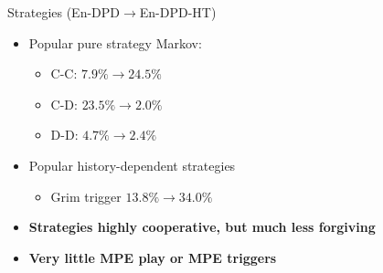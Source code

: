 \documentclass{beamer}
\begin{document}

\begin{frame}{Strategies (En-DPD$\rightarrow$En-DPD-HT)}

\begin{itemize}
\item Popular pure strategy Markov:

\begin{itemize}
\item C-C: $7.9\%\rightarrow24.5\%$
\item C-D: $23.5\%\rightarrow2.0\%$
\item D-D: $4.7\%\rightarrow2.4\%$
\end{itemize}
\item Popular history-dependent strategies

\begin{itemize}
\item Grim trigger $13.8\%\rightarrow34.0\%$
\end{itemize}
\item \textbf{Strategies highly cooperative, but much less forgiving}
\item \textbf{Very little MPE play or MPE triggers}
\end{itemize}
\end{frame}



\end{document}

